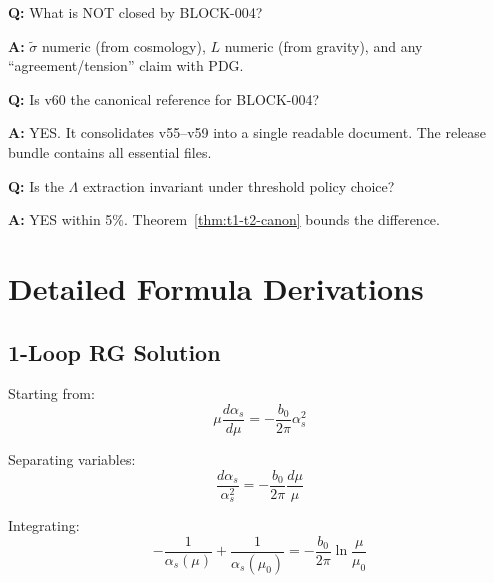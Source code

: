 \documentclass[11pt,a4paper]{article}
\theoremstyle{definition}
\begin{document}
\begin{trapbox}
\textbf{Q:} What is NOT closed by BLOCK-004?

\textbf{A:} $\tilde{\sigma}$ numeric (from cosmology), $L$ numeric (from gravity),
and any ``agreement/tension'' claim with PDG.
\end{trapbox}

\begin{trapbox}
\textbf{Q:} Is v60 the canonical reference for BLOCK-004?

\textbf{A:} YES. It consolidates v55--v59 into a single readable document.
The release bundle contains all essential files.
\end{trapbox}

\begin{trapbox}
\textbf{Q:} Is the $\Lambda$ extraction invariant under threshold policy choice?

\textbf{A:} YES within 5\%. Theorem~\ref{thm:t1-t2-canon} bounds the difference.
\end{trapbox}

\appendix
\section{Detailed Formula Derivations}
\label{app:derivations}

\subsection{1-Loop RG Solution}
\label{subsec:app-1loop}

Starting from:
\begin{equation}
\label{eq:app-1}
\mu\frac{d\alpha_s}{d\mu} = -\frac{b_0}{2\pi}\alpha_s^2
\end{equation}

Separating variables:
\begin{equation}
\label{eq:app-2}
\frac{d\alpha_s}{\alpha_s^2} = -\frac{b_0}{2\pi}\frac{d\mu}{\mu}
\end{equation}

Integrating:
\begin{equation}
\label{eq:app-3}
-\frac{1}{\alpha_s(\mu)} + \frac{1}{\alpha_s(\mu_0)} = -\frac{b_0}{2\pi}\ln\frac{\mu}{\mu_0}
\end{equation}
\end{document}
